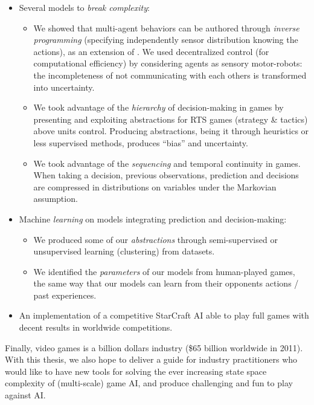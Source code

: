 \begin{itemize}
    \item Several models to \textit{break complexity}:
    \begin{itemize}
        \item We showed that multi-agent behaviors can be authored through \textit{inverse programming} (specifying independently sensor distribution knowing the actions), as an extension of \citep{theseRonan}. We used decentralized control (for computational efficiency) by considering agents as sensory motor-robots: the incompleteness of not communicating with each others is transformed into uncertainty.
        \item We took advantage of the \textit{hierarchy} of decision-making in games by presenting and exploiting abstractions for RTS games (strategy \& tactics) above units control. Producing abstractions, being it through heuristics or less supervised methods, produces ``bias'' and uncertainty.
        \item We took advantage of the \textit{sequencing} and temporal continuity in games. When taking a decision, previous observations, prediction and decisions are compressed in distributions on variables under the Markovian assumption. %
    \end{itemize}

    \item Machine \textit{learning} on models integrating prediction and decision-making:
    \begin{itemize}
        \item We produced some of our \textit{abstractions} through semi-supervised or unsupervised learning (clustering) from datasets.
        \item We identified the \textit{parameters} of our models from human-played games, the same way that our models can learn from their opponents actions / past experiences.
    \end{itemize}
    \item An implementation of a competitive StarCraft AI able to play full games with decent results in worldwide competitions.

\end{itemize}

Finally, video games is a billion dollars industry (\$65 billion worldwide in 2011). With this thesis, we also hope to deliver a guide for industry practitioners who would like to have new tools for solving the ever increasing state space complexity of (multi-scale) game AI, and produce challenging and fun to play against AI. %

